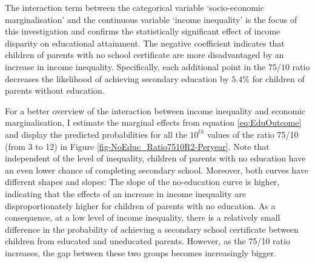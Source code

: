 \documentclass[a4paper, 12pt]{article}
\begin{document}
The interaction term between the categorical variable ‘socio-economic marginalisation’ and the continuous variable ‘income inequality’ is the focus of this investigation and confirms the statistically significant effect of income disparity on educational attainment. The negative coefficient indicates that children of parents with no school certificate are more disadvantaged by an increase in income inequality. Specifically, each additional point in the $75/10$ ratio decreases the likelihood of achieving secondary education by $5.4\%$ for children of parents without education.




For a better overview of the interaction between income inequality and economic marginalisation, I estimate the marginal effects from equation \eqref{eq:EduOutcome} and display the predicted probabilities for all the $10^{th}$ values of the ratio 75/10 (from 3 to 12) in Figure \ref{fig-NoEduc_Ratio7510R2-Peryear}. Note that independent of the level of inequality, children of parents with no education have an even lower chance of completing secondary school. Moreover, both curves have different shapes and slopes: The slope of the no-education curve is higher, indicating that the effects of an increase in income inequality are disproportionately higher for children of parents with no education. As a consequence, at a low level of income inequality, there is a relatively small difference in the probability of achieving a secondary school certificate between children from educated and uneducated parents. However, as the 75/10 ratio increases, the gap between these two groups becomes increasingly bigger.
\end{document}
